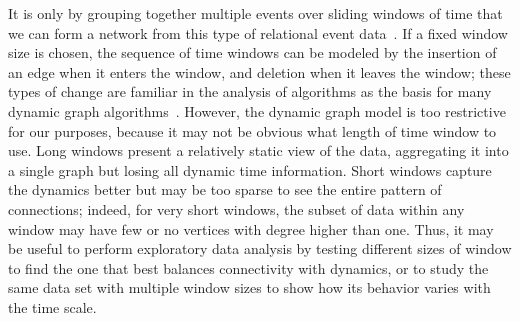 \documentclass[11pt]{article}
\begin{document}
It is only by grouping together multiple events over sliding windows of time that we can form a network from this type of relational event data~\cite{CorPreVol-JCGS-03,MooMcFBen-AJS-05,KosWat-AJS-09}. If a fixed window size is chosen, the sequence of time windows can be modeled by the insertion of an edge when it enters the window, and deletion when it leaves the window; these types of change are familiar in the analysis of algorithms as the basis for many dynamic graph algorithms~\cite{EppGalIta-ATCH-99}. However, the dynamic graph model is too restrictive for our purposes, because it may not be obvious what length of time window to use. Long windows present a relatively static view of the data, aggregating it into a single graph but losing all dynamic time information. Short windows capture the dynamics better but may be too sparse to see the entire pattern of connections; indeed, for very short windows, the subset of data within any window may have few or no vertices with degree higher than one. Thus, it may be useful to perform exploratory data analysis by testing different sizes of window to find the one that best balances connectivity with dynamics, or to study the same data set with multiple window sizes to show how its behavior varies with the time scale.
\end{document}
